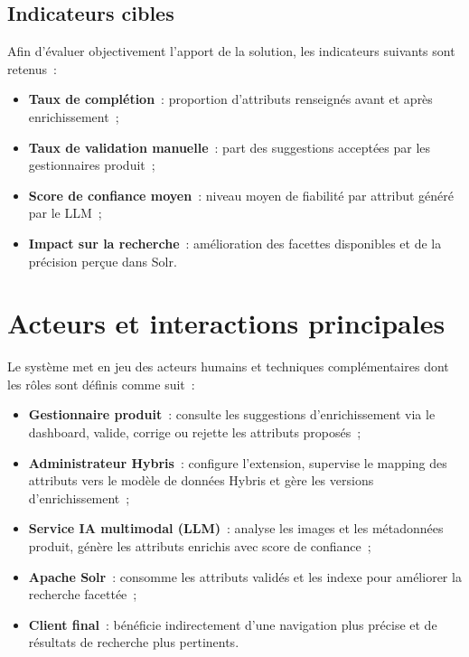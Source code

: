 \subsection{Indicateurs cibles}
Afin d'évaluer objectivement l'apport de la solution, les indicateurs suivants sont retenus~:
\begin{itemize}
  \item \textbf{Taux de complétion}~: proportion d'attributs renseignés avant et après enrichissement~;
  \item \textbf{Taux de validation manuelle}~: part des suggestions acceptées par les gestionnaires produit~;
  \item \textbf{Score de confiance moyen}~: niveau moyen de fiabilité par attribut généré par le LLM~;
  \item \textbf{Impact sur la recherche}~: amélioration des facettes disponibles et de la précision perçue dans Solr.
\end{itemize}

\section{Acteurs et interactions principales}
Le système met en jeu des acteurs humains et techniques complémentaires dont les rôles sont définis comme suit~:

\begin{itemize}
  \item \textbf{Gestionnaire produit}~: consulte les suggestions d'enrichissement via le dashboard, valide, corrige ou rejette les attributs proposés~;
  \item \textbf{Administrateur Hybris}~: configure l'extension, supervise le mapping des attributs vers le modèle de données Hybris et gère les versions d'enrichissement~;
  \item \textbf{Service IA multimodal (LLM)}~: analyse les images et les métadonnées produit, génère les attributs enrichis avec score de confiance~;
  \item \textbf{Apache Solr}~: consomme les attributs validés et les indexe pour améliorer la recherche facettée~;
  \item \textbf{Client final}~: bénéficie indirectement d'une navigation plus précise et de résultats de recherche plus pertinents.
\end{itemize}

